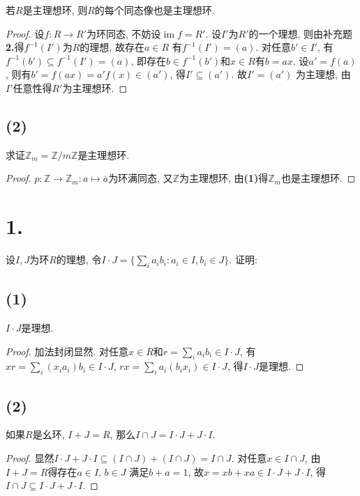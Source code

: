 \documentclass[12pt, a4paper, fontset=windows]{ctexart}
\newcommand{\Z}{\mathbb{Z}}
\newcommand{\cl}[1]{\overline{#1}} %
\newcommand{\im}{\operatorname{im}}
\begin{document}
若$R$是主理想环, 则$R$的每个同态像也是主理想环. 

\begin{proof}
设$f:R\to R'$为环同态, 不妨设$\im f=R'$. 设$I'$为$R'$的一个理想, 
则由补充题{\bf 2.}得$f^{-1}(I')$为$R$的理想, 故存在$a\in R$
有$f^{-1}(I')=(a)$. 对任意$b'\in I'$, 有$f^{-1}(b')\subseteq f^{-1}(I')=(a)$, 
即存在$b\in f^{-1}(b')$和$x\in R$有$b=ax$. 设$a'=f(a)$, 
则有$b'=f(ax)=a'f(x)\in(a')$, 得$I'\subseteq(a')$. 故$I'=(a')$
为主理想, 由$I'$任意性得$R'$为主理想环. 
\end{proof}

\subsection*{(2)}

求证$\Z_m=\Z/m\Z$是主理想环. 

\begin{proof}
$p:\Z\to\Z_m:a\mapsto\cl{a}$为环满同态, 又$\Z$为主理想环, 
由{\bf (1)}得$\Z_m$也是主理想环. 
\end{proof}

\section*{1.}

设$I,J$为环$R$的理想, 令$I\cdot J=\{\sum_ia_ib_i:a_i\in I,b_i\in J\}$. 证明: 

\subsection*{(1)}

$I\cdot J$是理想. 

\begin{proof}
加法封闭显然. 对任意$x\in R$和$r=\sum_ia_ib_i\in I\cdot J$, 
有$xr=\sum_i(x_ia_i)b_i\in I\cdot J$, $rx=\sum_ia_i(b_ix_i)\in I\cdot J$, 
得$I\cdot J$是理想. 
\end{proof}

\subsection*{(2)}

如果$R$是幺环, $I+J=R$, 那么$I\cap J=I\cdot J+J\cdot I$. 

\begin{proof}
显然$I\cdot J+J\cdot I\subseteq(I\cap J)+(I\cap J)=I\cap J$. 
对任意$x\in I\cap J$, 由$I+J=R$得存在$a\in I$, $b\in J$
满足$b+a=1$, 故$x=xb+xa\in I\cdot J+J\cdot I$, 
得$I\cap J\subseteq I\cdot J+J\cdot I$. 
\end{proof}
\end{document}
